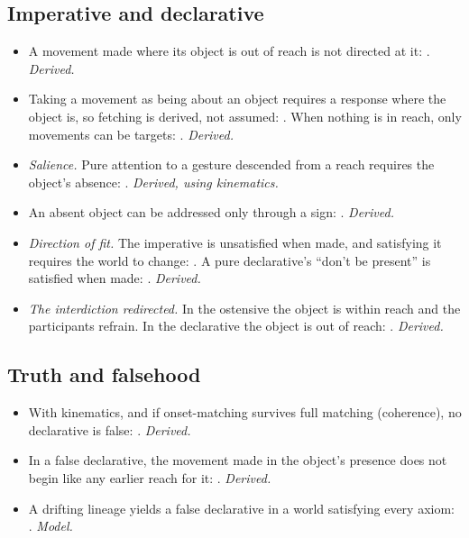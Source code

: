 \documentclass[11pt]{article}
\begin{document}
\subsection{Imperative and declarative}
\begin{itemize}
  \item A movement made where its object is out of reach is not directed at it:
    . \emph{Derived.}
  \item Taking a movement as being about an object requires a response where the object
    is, so fetching is derived, not assumed: . When nothing is in
    reach, only movements can be targets: . \emph{Derived.}
  \item \emph{Salience.} Pure attention to a gesture descended from a reach requires the
    object's absence: . \emph{Derived, using kinematics.}
  \item An absent object can be addressed only through a sign:
    . \emph{Derived.}
  \item \emph{Direction of fit.} The imperative is unsatisfied when made, and satisfying it
    requires the world to change: . A pure declarative's
    ``don't be present'' is satisfied when made: .
    \emph{Derived.}
  \item \emph{The interdiction redirected.} In the ostensive the object is within reach and
    the participants refrain. In the declarative the object is out of reach:
    . \emph{Derived.}
\end{itemize}

\subsection{Truth and falsehood}
\begin{itemize}
  \item With kinematics, and if onset-matching survives full matching (coherence), no
    declarative is false: . \emph{Derived.}
  \item In a false declarative, the movement made in the object's presence does not begin
    like any earlier reach for it: . \emph{Derived.}
  \item A drifting lineage yields a false declarative in a world satisfying every axiom:
    . \emph{Model.}
\end{itemize}
\end{document}
